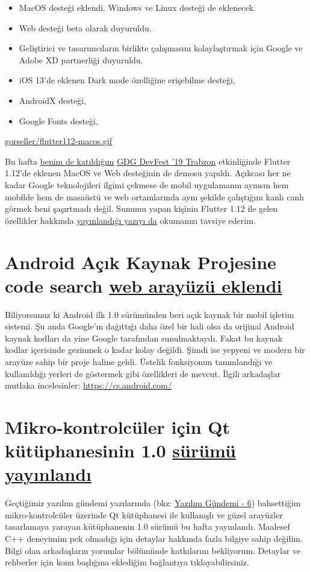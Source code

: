 \documentclass[11pt]{article}
\begin{document}
\begin{itemize}
\item MacOS desteği eklendi. Windows ve Linux desteği de eklenecek.
\item Web desteği beta olarak duyuruldu.
\item Geliştirici ve tasarımcıların birlikte çalışmasını kolaylaştırmak için
Google ve Adobe XD partnerliği duyuruldu.
\item iOS 13'de eklenen Dark mode özelliğine erişebilme desteği,
\item AndroidX desteği,
\item Google Fonts desteği,
\end{itemize}

\url{gorseller/flutter112-macos.gif}

Bu hafta \href{https://teknoseyir.com/durum/1186783}{benim de katıldığım} \href{https://www.meetup.com/tr-TR/GDGTrabzon/events/265973568/}{GDG DevFest '19 Trabzon} etkinliğinde Flutter
1.12'de eklenen MacOS ve Web desteğinin de demosu yapıldı. Açıkcası her ne
kadar Google teknolojileri ilgimi çekmese de mobil uygulamanın aynısın hem
mobilde hem de masaüstü ve web ortamlarında aynı şekilde çalıştığını kanlı
canlı görmek beni şaşırtmadı değil. Sunumu yapan kişinin Flutter 1.12 ile gelen
özellikler hakkında \href{https://medium.com/@sercanyusuf/flutter-interact-all-you-need-to-know-207f5ffccfb9}{yayınlandığı yazıyı da} okumanızı tavsiye ederim.
\section{Android Açık Kaynak Projesine code search \href{https://android-developers.googleblog.com/2019/12/code-search-with-cross-references-for-aosp.html}{web arayüzü eklendi}}
\label{sec:org9d71ba5}
Biliyorsunuz ki Android ilk 1.0 sürümünden beri açık kaynak bir mobil işletim
sistemi. Şu anda Google'ın dağıttığı daha özel bir hali olsa da orijinal
Android kaynak kodları da yine Google tarafından sunulmaktaydı. Fakat bu kaynak
kodlar içerisinde gezinmek o kadar kolay değildi. Şimdi ise yepyeni ve modern
bir arayüze sahip bir proje haline geldi. Üstelik fonksiyonun tanımlandığı ve
kullanıldığı yerleri de göstermek gibi özellikleri de mevcut. İlgili arkadaşlar
mutlaka incelesinler: \url{https://cs.android.com/}
\section{Mikro-kontrolcüler için Qt kütüphanesinin 1.0 \href{https://www.qt.io/blog/qt-for-mcus-1.0}{sürümü yayınlandı}}
\label{sec:org9d07097}
Geçtiğimiz yazılım gündemi yazılarında (bkz: \href{../06/yazilim-gundemi-06.pdf}{Yazılım Gündemi - 6}) bahsettiğim
mikro-kontrolcüler üzerinde Qt kütüphanesi ile kullanışlı ve güzel arayüzler
tasarlamaya yarayan kütüphanenin 1.0 sürümü bu hafta yayınlandı. Maalesef C++
deneyimim pek olmadığı için detaylar hakkında fazla bilgiye sahip değilim.
Bilgi olan arkadaşların yorumlar bölümünde katkılarını bekliyorum. Detaylar ve
rehberler için konu başlığına eklediğim bağlantıya tıklayabilirsiniz.
\end{document}

